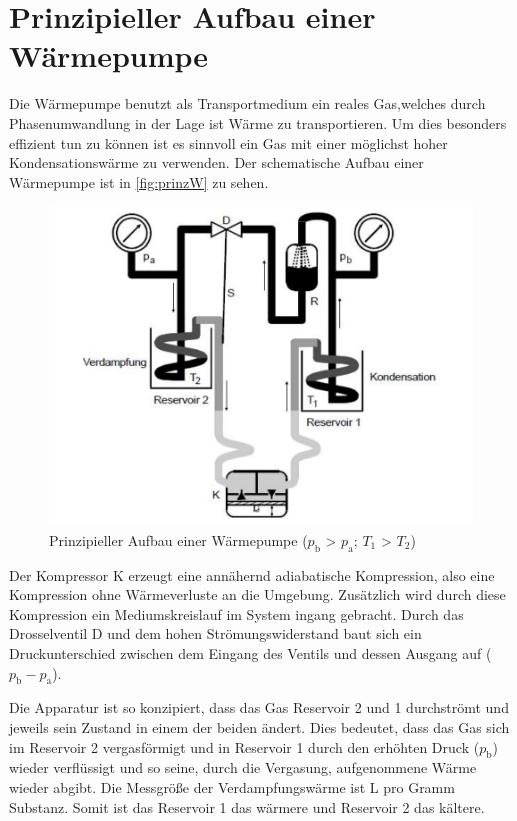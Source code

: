         \section{Prinzipieller Aufbau einer Wärmepumpe}
    	Die Wärmepumpe benutzt als Transportmedium ein reales Gas,welches durch Phasenumwandlung in der Lage ist Wärme zu transportieren. 
        Um dies besonders effizient tun zu können ist es sinnvoll ein Gas mit einer möglichst hoher Kondensationswärme zu verwenden. 
        Der schematische Aufbau einer Wärmepumpe ist in \autoref{fig:prinzW} zu sehen.
        \begin{figure}
            \centering
               \includegraphics[scale=0.75]{aufbau_1.pdf}
               \caption{Prinzipieller Aufbau einer Wärmepumpe ($p_\text{b}$ > $p_\text{a}$; $T_1$ > $T_2$)}
               \label{fig:prinzW}
        \end{figure}
        Der Kompressor K erzeugt eine annähernd adiabatische Kompression, also eine Kompression ohne Wärmeverluste an die Umgebung. 
        Zusätzlich wird durch diese Kompression ein Mediumskreislauf im System ingang gebracht. Durch das Drosselventil D und dem hohen Strömungswiderstand baut sich ein Druckunterschied
        zwischen dem Eingang des Ventils und dessen Ausgang auf ($p_\text{b}-p_\text{a}$).

        Die Apparatur ist so konzipiert, dass das Gas Reservoir 2 und 1 durchströmt und jeweils sein Zustand in einem der beiden ändert. Dies bedeutet, dass das Gas sich im Reservoir 2 
        vergasförmigt und in Reservoir 1 durch den erhöhten Druck ($p_\text{b}$) wieder verflüssigt und so seine, durch die Vergasung, aufgenommene Wärme wieder abgibt. Die Messgröße der 
        Verdampfungswärme ist L pro Gramm Substanz.  Somit ist das Reservoir 1 das wärmere und Reservoir 2 das kältere.

